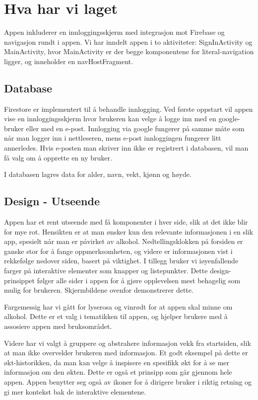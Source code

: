 \section{Hva har vi laget}
Appen inkluderer en innloggingsskjerm med integrasjon mot Firebase og navigasjon rundt i appen. Vi har inndelt appen i to aktiviteter: SignInActivity og MainActivity, hvor MainActivity er der begge komponentene for literal-navigation ligger, og inneholder en navHostFragment. 

\subsection{Database}
Firestore er implementert til å behandle innlogging. Ved første oppstart vil appen vise en innloggingsskjerm hvor brukeren kan velge å logge inn med en google-bruker eller med en e-post. Innlogging via google fungerer på samme måte som når man logger inn i nettleseren, mens e-post innloggingen fungerer litt annerledes. Hvis e-posten man skriver inn ikke er registrert i databasen, vil man få valg om å opprette en ny bruker.

I databasen lagres data for alder, navn, vekt, kjønn og høyde.

\subsection{Design - Utseende}
Appen har et rent utseende med få komponenter i hver side, slik at det ikke blir for mye rot. Hensikten er at man ønsker kun den relevante informasjonen i en slik app, spesielt når man er påvirket av alkohol. Nedtellingsklokken på forsiden er ganske stor for å fange oppmerksomheten, og videre er informasjonen vist i rekkefølge nedover siden, basert på viktighet. I tillegg bruker vi iøyenfallende farger på interaktive elementer som knapper og listepunkter. Dette design-prinsippet følger alle sider i appen for å gjøre opplevelsen mest behagelig som mulig for brukeren. Skjermbildene ovenfor demonstrerer dette.

Fargemessig har vi gått for lyserosa og vinrødt for at appen skal minne om alkohol. Dette er et valg i tematikken til appen, og hjelper brukere med å assosiere appen med bruksområdet. 

Videre har vi valgt å gruppere og abstrahere informasjon vekk fra startsiden, slik at man ikke overvelder brukeren med informasjon. Et godt eksempel på dette er økt-historikken, da man kan velge å inspisere en spesifikk økt for å se mer informasjon om den økten. Dette er også et prinsipp som går gjennom hele appen. Appen benytter seg også av ikoner for å dirigere bruker i riktig retning og gi mer kontekst bak de interaktive elementene.

